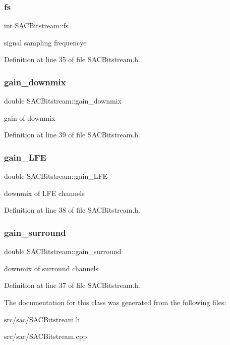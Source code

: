 \subsubsection{\texorpdfstring{fs}{fs}}
{\footnotesize\ttfamily int S\+A\+C\+Bitstream\+::fs}

signal sampling frequencye 

Definition at line 35 of file S\+A\+C\+Bitstream.\+h.

\mbox{\label{class_s_a_c_bitstream_a2f4bba870168dd984a7ed4d5214024ed}} 
\subsubsection{\texorpdfstring{gain\+\_\+downmix}{gain\_downmix}}
{\footnotesize\ttfamily double S\+A\+C\+Bitstream\+::gain\+\_\+downmix}

gain of downmix 

Definition at line 39 of file S\+A\+C\+Bitstream.\+h.

\mbox{\label{class_s_a_c_bitstream_a4edc51fec93b93461156d8fa376e0116}} 
\subsubsection{\texorpdfstring{gain\+\_\+\+L\+FE}{gain\_LFE}}
{\footnotesize\ttfamily double S\+A\+C\+Bitstream\+::gain\+\_\+\+L\+FE}

downmix of L\+FE channels 

Definition at line 38 of file S\+A\+C\+Bitstream.\+h.

\mbox{\label{class_s_a_c_bitstream_acf9019de0f79c54aae0ffa29a57c3194}} 
\subsubsection{\texorpdfstring{gain\+\_\+surround}{gain\_surround}}
{\footnotesize\ttfamily double S\+A\+C\+Bitstream\+::gain\+\_\+surround}

downmix of surround channels 

Definition at line 37 of file S\+A\+C\+Bitstream.\+h.



The documentation for this class was generated from the following files\+:\begin{DoxyCompactItemize}
\item 
src/sac/S\+A\+C\+Bitstream.\+h\item 
src/sac/S\+A\+C\+Bitstream.\+cpp\end{DoxyCompactItemize}
